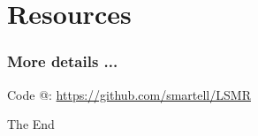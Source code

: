 \documentclass{beamer}
\begin{document}



% 
\section{Resources} %
\label{sec:resources}


\begin{frame}
	\frametitle{More details ...}
	
	Code @:
	\url{https://github.com/smartell/LSMR}
\end{frame}



 
\begin{frame}
\centerline{The End}
\end{frame}
\end{document}
